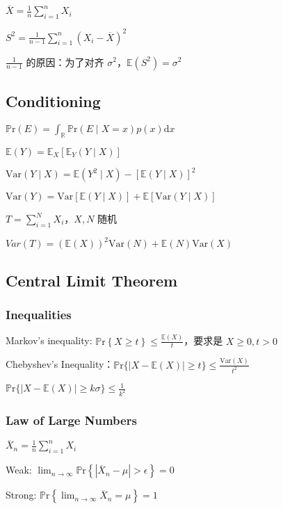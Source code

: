 \documentclass[9pt,landscape]{article}
\begin{document}
\begin{multicols}{3}
$\overline{X}=\frac{1}{n}\sum_{i=1}^{n}X_i$

$S^2=\frac{1}{n-1}\sum_{i=1}^{n}\left(X_i-\overline{X}\right)^2$

$\frac{1}{n-1}$ 的原因：为了对齐 $\sigma^2$，$\mathbb{E}(S^2)=\sigma^2$

\subsection{Conditioning}

$\mathbb{P}\mathrm{r}(E)=\int_{\mathbb{R}}\mathbb{P}\mathrm{r}(E\mid X=x)p(x)\mathrm{d}x$

$\mathbb{E}(Y)=\mathbb{E}_X[\mathbb{E}_Y(Y\mid X)]$

$\mathrm{Var}(Y\mid X)=\mathbb{E}(Y^2\mid X)-[\mathbb{E}(Y\mid X)]^2$

$\mathrm{Var}(Y)=\mathrm{Var}[\mathbb{E}(Y\mid X)]+\mathbb{E}[\mathrm{Var}(Y\mid X)]$

$T=\sum_{i=1}^{N}X_i$，$X, N$ 随机

$Var(T)=(\mathbb{E}(X))^2\mathrm{Var}(N)+\mathbb{E}(N)\mathrm{Var}(X)$

\subsection{Central Limit Theorem}

\subsubsection{Inequalities}

Markov's inequality: $\mathbb{P}\mathrm{r}\left\{X\ge t\right\}\le\frac{\mathbb{E}(X)}{t}$，要求是 $X\ge 0, t>0$

Chebyshev's Inequality：$\mathbb{P}\mathrm{r}\{|X-\mathbb{E}(X)|\ge t\}\le\frac{\mathrm{Var}(X)}{t^2}$

$\mathbb{P}\mathrm{r}\{|X-\mathbb{E}(X)|\ge k\sigma\}\le\frac{1}{k^2}$

\subsubsection{Law of Large Numbers}

$\overline{X}_n=\frac{1}{n}\sum_{i=1}^{n}X_i$

Weak: $\lim_{n\to\infty}\mathbb{P}\mathrm{r}\left\{\left|\overline{X}_n-\mu\right|>\epsilon\right\}=0$

Strong: $\mathbb{P}\mathrm{r}\left\{\lim_{n\to\infty}\overline{X}_n=\mu\right\}=1$


\end{multicols}
\end{document}
